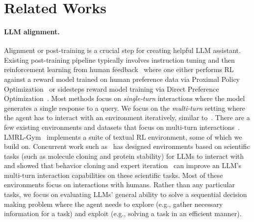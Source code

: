 \section{Related Works}


\paragraph{LLM alignment.} Alignment or post-training is a crucial step for creating helpful LLM assistant. Existing post-training pipeline typically involves instruction tuning and then reinforcement learning from human feedback~\citep[RLHF]{christiano2017deep} where one either performs RL against a reward model trained on human preference data via Proximal Policy Optimization~\citep[PPO]{schulman2017proximal} or sidesteps reward model training via Direct Preference Optimization~\citep[DPO]{rafailov2024direct}. Most methods focus on \textit{single-turn} interactions where the model generates a single response to a query. We focus on the \emph{multi-turn} setting where the agent has to interact with an environment iteratively, similar to~\citet{rafailov2024rqlanguagemodel}. There are a few existing environments and datasets that focus on multi-turn interactions~\citep{abdulhai2023lmrl, sun2023parrot, kwan2024mt, wang2024mint}. LMRL-Gym~\citep{abdulhai2023lmrl} implements a suite of textual RL environment, some of which we build on. Concurrent work such as~\citet{narayanan2024aviarytraininglanguageagents} has designed environments based on scientific tasks (such as molecule cloning and protein stability) for LLMs to interact with and showed that behavior cloning and expert iteration~\citep{anthony2017thinkingfastslowdeep,anthony2019policygradientsearchonline,havrilla2024teachinglargelanguagemodels} can improve an LLM's multi-turn interaction capabilities on these scientific tasks. Most of these environments focus on interactions with humans. Rather than any particular tasks, we focus on evaluating LLMs' general ability to solve a sequential decision making problem where the agent needs to explore (e.g., gather necessary information for a task) and exploit (e.g., solving a task in an efficient manner).



